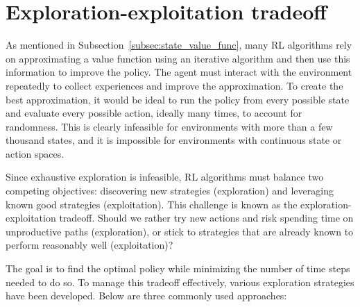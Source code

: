 \documentclass[
  digital,     %
  oneside,     %
  nosansbold,  %
  nocolorbold, %
  lof,         %
  lot,         %
]{fithesis4}
\begin{document}
\section{Exploration-exploitation tradeoff}
\label{sec:explor-exploit}
As mentioned in Subsection~\ref{subsec:state_value_func}, many RL algorithms rely on approximating a value function using an iterative algorithm and then use this information to improve the policy. The agent must interact with the environment repeatedly to collect experiences and improve the approximation. To create the best approximation, it would be ideal to run the policy from every possible state and evaluate every possible action, ideally many times, to account for randomness. This is clearly infeasible for environments with more than a few thousand states, and it is impossible for environments with continuous state or action spaces.

Since exhaustive exploration is infeasible, RL algorithms must balance two competing objectives: discovering new strategies (exploration) and leveraging known good strategies (exploitation). This challenge is known as the exploration-exploitation tradeoff. Should we rather try new actions and risk spending time on unproductive paths (exploration), or stick to strategies that are already known to perform reasonably well (exploitation)?

The goal is to find the optimal policy while minimizing the number of time steps needed to do so. To manage this tradeoff effectively, various exploration strategies have been developed. Below are three commonly used approaches:
\end{document}
